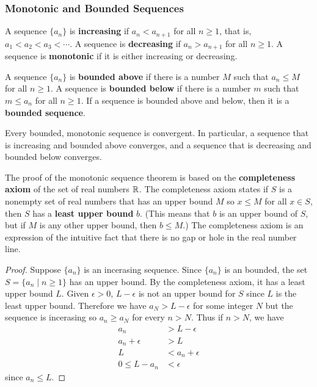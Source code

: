 \subsubsection*{Monotonic and Bounded Sequences}
\begin{definition}
    A sequence \(\{a_n\}\) is \textbf{increasing} if \(a_n<a_{n+1}\) for all
    \(n\geq 1\), that is, \(a_1<a_2<a_3<\cdots\).
    A sequence is \textbf{decreasing} if \(a_n>a_{n+1}\) for all \(n\geq 1\).
    A sequence is \textbf{monotonic} if it is either increasing or decreasing.
\end{definition}
\begin{definition}
    A sequence \(\{a_n\}\) is \textbf{bounded above} if there is a number
    \(M\) such that \(a_n\leq M\) for all \(n\geq 1\).
    A sequence is \textbf{bounded below} if there is a number
    \(m\) such that \(m\leq a_n\) for all \(n\geq 1\).
    If a sequence is bounded above and below, then it is a
    \textbf{bounded sequence}.
\end{definition}
\begin{theorem}
    Every bounded, monotonic sequence is convergent.
    In particular, a sequence that is increasing and bounded above converges,
    and a sequence that is decreasing and bounded below converges.
\end{theorem}
The proof of the monotonic sequence theorem is based on the
\textbf{completeness axiom} of the set of real numbers \(\mathbb{R}\).
The completeness axiom states if \(S\) is a nonempty set of real numbers that
has an upper bound \(M\) so \(x\leq M\) for all \(x\in S\), then \(S\) has a
\textbf{least upper bound} \(b\).
(This means that \(b\) is an upper bound of \(S\),
but if \(M\) is any other upper bound, then \(b\leq M\).)
The completeness axiom is an expression of the intuitive fact that there is no
gap or hole in the real number line.
\begin{proof}
    Suppose \(\{a_n\}\) is an incerasing sequence.
    Since \(\{a_n\}\) is an bounded, the set \(S=\{a_n\mid n\geq 1\}\) has an
    upper bound.
    By the completeness axiom, it has a least upper bound \(L\).
    Given \(\epsilon>0\), \(L-\epsilon\) is not an upper bound for \(S\) since
    \(L\) is the least upper bound.
    Therefore we have \(a_N>L-\epsilon\) for some integer \(N\) but the
    sequence is incerasing so \(a_n\geq a_N\) for every \(n>N\).
    Thus if \(n>N\), we have
    \begin{align*}
        a_n &> L-\epsilon \\
        a_n+\epsilon &> L \\
        L &< a_n +\epsilon \\
        0 \leq L-a_n &< \epsilon
    \end{align*}
    since \(a_n\leq L\).
\end{proof}